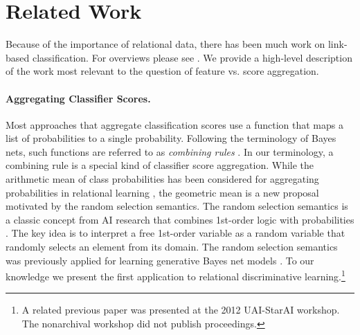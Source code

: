 \documentclass[oribibl]{llncs}%
\begin{document}
\section{Related Work} Because of the importance of relational data, there has been much work on link-based classification. For overviews please see \cite{han2009,Bina2012}. We provide a high-level description of the work most relevant to the question of feature vs. score aggregation.

\paragraph{Aggregating Classifier Scores.} Most approaches that aggregate classification scores use a function that maps a list of probabilities to a single probability. Following the terminology of Bayes nets, such functions are referred to as {\em combining rules} \cite{Pearl1988,Kersting2007}. In our terminology, a combining rule is a special kind of classifier score aggregation. 
While the arithmetic mean of class probabilities has been considered for aggregating probabilities in relational learning \cite{Natarajan2008}, the geometric mean is a new proposal motivated by the random selection semantics. The random selection semantics is a classic concept from AI research that combines 1st-order logic with probabilities \cite{Halpern90,Bacchus90}. The key idea is to interpret a free 1st-order variable as a random variable that randomly selects an element from its domain. The random selection semantics was previously applied for learning generative Bayes net models \cite{Schulte2011}. To our knowledge we present the first application to relational discriminative learning.\footnote{A related previous paper was presented at the 2012 UAI-StarAI workshop.
 The nonarchival workshop did not publish proceedings. 
}
\end{document}

